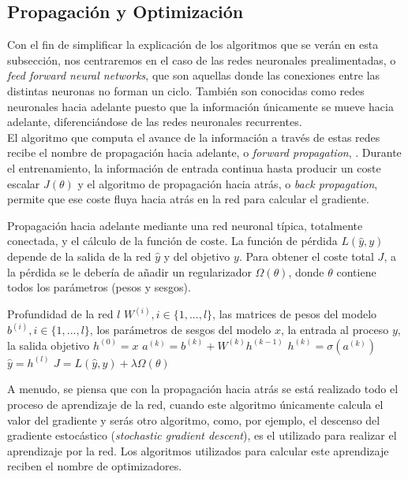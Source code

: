 \begin{itemize}
\subsection{Propagación y Optimización}
Con el fin de simplificar la explicación de los algoritmos que se verán en esta subsección, nos centraremos en el caso de las redes neuronales prealimentadas, o \emph{feed forward neural networks}, que son aquellas donde las conexiones entre las distintas neuronas no forman un ciclo. También son conocidas como redes neuronales hacia adelante puesto que la información únicamente se mueve hacia adelante, diferenciándose de las redes neuronales recurrentes.\\

El algoritmo que computa el avance de la información a través de estas redes recibe el nombre de propagación hacia adelante, o \emph{forward propagation}, \cite{Goodfellow-et-al-2016}. Durante el entrenamiento, la información de entrada continua hasta producir un coste escalar $J(\theta)$ y el algoritmo de propagación hacia atrás, o \emph{back propagation}, permite que ese coste fluya hacia atrás en la red para calcular el gradiente. \\

\begin{algorithm}\label{alg:forward}
\caption{Propagación hacia adelante mediante una red neuronal típica, totalmente conectada, y el cálculo de la función de coste. La función de pérdida $L(\hat{y},y)$ depende de la salida de la red $\hat{y}$ y del objetivo $y$. Para obtener el coste total $J$, a la pérdida se le debería de añadir un regularizador $\Omega(\theta)$, donde $\theta$ contiene todos los parámetros (pesos y sesgos). \cite{Goodfellow-et-al-2016}}
\begin{algorithmic}
\REQUIRE Profundidad de la red $l$
\REQUIRE $W^{(i)}, i\in\{1,...,l\}$, las matrices de pesos del modelo
\REQUIRE $b^{(i)}, i\in\{1,...,l\}$, los parámetros de sesgos del modelo
\REQUIRE $x$, la entrada al proceso
\REQUIRE $y$, la salida objetivo
\STATE $h^{(0)}=x$
\STATE $a^{(k)}=b^{(k)}+W^{(k)}h^{(k-1)}$
\STATE $h^{(k)}=\sigma(a^{(k)})$
\ENDFOR
\STATE $\hat{y}=h^{(l)}$
\STATE $J=L(\hat{y},y)+\lambda\Omega (\theta)$
\end{algorithmic}
\end{algorithm}

A menudo, se piensa que con la propagación hacia atrás se está realizado todo el proceso de aprendizaje de la red, cuando este algoritmo únicamente calcula el valor del gradiente y serás otro algoritmo, como, por ejemplo, el descenso del gradiente estocástico (\emph{stochastic gradient descent}), es el utilizado para realizar el aprendizaje por la red. Los algoritmos utilizados para calcular este aprendizaje reciben el nombre de optimizadores.\\


\end{itemize}
